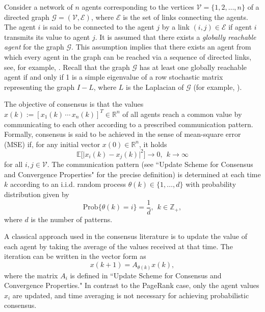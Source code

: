 \documentclass[11pt,draftcls,onecolumn]{IEEEtran}
\newcommand{\abs}[1]{\lvert#1\rvert}
\newcommand{\field}[1]{{\mathbb{#1}}}
\newcommand{\Prob}{\mathrm{Prob}}
\newcommand{\R}{\field{R}}
\newcommand{\Z}{\field{Z}}
\newcommand{\E}{\field{E}}
\begin{document}
Consider a  network of $n$ agents corresponding to the vertices $\mathcal{V}=\{1,2,\ldots,n\}$ 
of a directed graph $\mathcal{G}=(\mathcal{V},\mathcal{E})$, where $\mathcal{E}$
is the set of links connecting the agents. The agent $i$ is said to be connected 
to the agent $j$ by a link $(i,j)\in\mathcal{E}$ if agent $i$ transmits its 
value to agent $j$. It is assumed that there exists a {\it globally reachable agent} 
for the  graph $\mathcal{G}$. This assumption implies that there exists an agent from which
every agent in the graph can be reached via a sequence of directed links, see, for example, 
\cite{BulCorMar:09,LinFraMag:05,RenBea:05}. Recall that the graph 
$\mathcal{G}$ has at least one globally reachable agent if and only if 1 is 
a simple eigenvalue of a row stochastic matrix representing the graph $I - L$, 
where $L$ is the Laplacian of $\mathcal{G}$ (for example, \cite{BulCorMar:09}).

The objective of consensus is that the values 
$x(k):= [x_1(k) \,\cdots\, x_n(k)]^T\in\R^n$ of all agents reach a common value 
by communicating to each other according to a prescribed communication pattern. 
Formally, consensus is said to be achieved in the sense of mean-square error (MSE) if, 
for any initial vector $x(0)\in\R^n$, it holds
\begin{equation}
\E\bigl[\abs{x_i(k)-x_j(k)}^2\bigr] \rightarrow 0,~~k\rightarrow\infty
\nonumber
\end{equation}
for all $i,j\in\mathcal{V}$.
The communication pattern (see ``Update Scheme for Consensus and Convergence Properties" 
for the precise definition) 
is determined at each time $k$ according to an i.i.d. random process
$\theta(k) \in\{1,\ldots,d\}$ with probability distribution given by 
$$
\Prob\{\theta(k)=i\} = \frac{1}{d},~~k\in\Z_+, 
$$
where $d$ is the number of patterns.


A classical approach used in the consensus literature is to update the value of each agent
by taking the average of the values received at that time.
The iteration can be written in the vector form as
\begin{equation}
x(k+1) = A_{\theta(k)} x(k),
\nonumber
\end{equation}
where the matrix $A_i$ is defined in
``Update Scheme for Consensus and Convergence Properties." 
In contrast to the PageRank case, only the agent values $x_i$ are updated,
and time averaging is not necessary for achieving probabilistic consensus.
\end{document}
